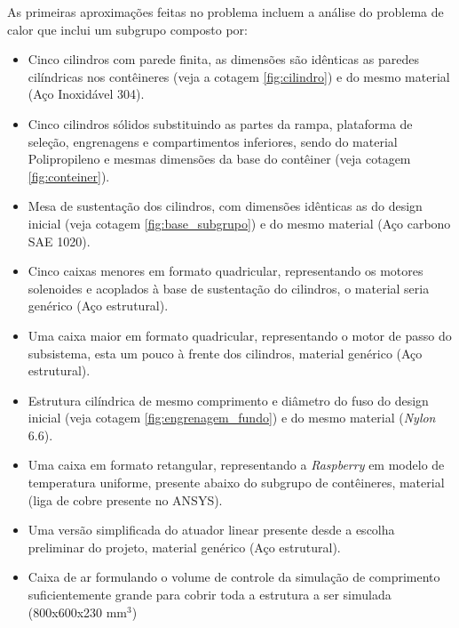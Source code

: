 As primeiras aproximações feitas no problema incluem a análise do problema de calor que inclui um subgrupo composto por:
\begin{itemize}
    \item Cinco cilindros com parede finita, as dimensões são idênticas as paredes cilíndricas nos contêineres (veja a cotagem \ref{fig:cilindro}) e do mesmo material (Aço Inoxidável 304).
    \item Cinco cilindros sólidos substituindo as partes da rampa, plataforma de seleção, engrenagens e compartimentos inferiores, sendo do material Polipropileno e mesmas dimensões da base do contêiner (veja cotagem \ref{fig:conteiner}). 
    \item Mesa de sustentação dos cilindros, com dimensões idênticas as do design inicial (veja cotagem \ref{fig:base_subgrupo}) e do mesmo material (Aço carbono SAE 1020).
    \item Cinco caixas menores em formato quadricular, representando os motores solenoides e acoplados à base de sustentação do cilindros, o material seria genérico (Aço estrutural).
    \item Uma caixa maior em formato quadricular, representando o motor de passo do subsistema, esta um pouco à frente dos cilindros, material genérico (Aço estrutural).
    \item Estrutura cilíndrica de mesmo comprimento e diâmetro do fuso do design inicial (veja cotagem \ref{fig:engrenagem_fundo}) e do mesmo material (\textit{Nylon} 6.6).
    \item Uma caixa em formato retangular, representando a \textit{Raspberry} em modelo de temperatura uniforme, presente abaixo do subgrupo de contêineres, material (liga de cobre presente no ANSYS).
    \item Uma versão simplificada do atuador linear presente desde a escolha preliminar do projeto, material genérico (Aço estrutural).
    \item Caixa de ar formulando o volume de controle da simulação de comprimento suficientemente grande para cobrir toda a estrutura a ser simulada (800x600x230 mm$^3$)
\end{itemize}

